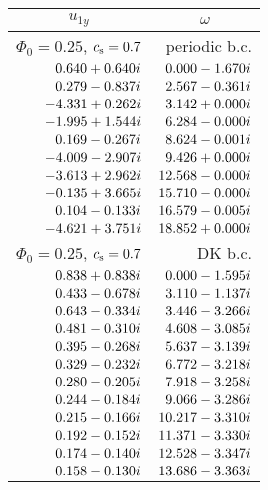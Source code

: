 \documentclass[useAMS,usenatbib]{mn2e}
\begin{document}
\begin {table}
\begin{center}
    \begin{tabular}{r r}
   \multicolumn{1}{c}{\Large $u_{1y}$} & \multicolumn{1}{c}{\Large $\omega$} \\[1mm]
    \hline
    $\Phi_0 =0.25$, $c_{\rm s}=0.7$ &  periodic b.c. \\
    \hline
    $0.640 		+	0.640i$ 	&  	$0.000  	- 	1.670i$\\
    $0.279 		- 	0.837i$ 	&  	$2.567  	- 	0.361i$ \\
    $-4.331 	+ 	0.262i$ 	& 	$3.142  	+ 	0.000i$ \\
    $-1.995 	+ 	1.544i$ 	& 	$6.284  	- 	0.000i$ \\
    $0.169  	- 	0.267i$ 	& 	$8.624  	- 	0.001i$ \\
    $-4.009  	- 	2.907i$  	& 	$9.426 	+ 	0.000i$ \\
    $-3.613  	+ 	2.962i$ 	& 	$12.568  	- 	0.000i$ \\
    $-0.135  	+ 	3.665i$ 	& 	$15.710  	- 	0.000i$ \\
    $0.104  	- 	0.133i$ 	& 	$16.579  	- 	0.005i$ \\
    $-4.621  	+ 	3.751i$ 	& 	$18.852  	+ 	0.000i$ \\
    \hline
    $\Phi_0 =0.25$, $c_{\rm s}=0.7$ &  DK b.c. \\
    \hline
    $0.838  	+ 	0.838i$ 	&  	$0.000 	 -	1.595i$ \\
    $0.433  	- 	0.678i$ 	&  	$3.110  	- 	1.137i$ \\
    $0.643  	- 	0.334i$ 	&  	$3.446  	- 	3.266i$ \\
    $0.481  	- 	0.310i$ 	&  	$4.608  	- 	3.085i$ \\
    $0.395 		- 	0.268i$ 	&  	$5.637  	- 	3.139i$ \\
    $0.329  	- 	0.232i$ 	&  	$6.772  	- 	3.218i$ \\
    $0.280  	- 	0.205i$ 	&  	$7.918  	- 	3.258i$ \\
    $0.244  	- 	0.184i$ 	&  	$9.066  	- 	3.286i$ \\
    $0.215  	- 	0.166i$ 	&  	$10.217  	- 	3.310i$ \\
    $0.192  	- 	0.152i$ 	&  	$11.371  	- 	3.330i$ \\
    $0.174  	- 	0.140i$ 	&  	$12.528  	- 	3.347i$ \\
    $0.158  	- 	0.130i$ 	&  	$13.686  	- 	3.363i$ \\

\end{tabular}
\end{center}
\end{table}
\end{document}
